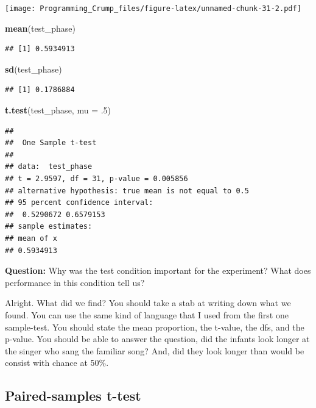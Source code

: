 \documentclass[]{book}
\newenvironment{Shaded}{\begin{snugshade}}{\end{snugshade}}
\newcommand{\KeywordTok}[1]{\textcolor[rgb]{0.13,0.29,0.53}{\textbf{{#1}}}}
\newcommand{\DataTypeTok}[1]{\textcolor[rgb]{0.13,0.29,0.53}{{#1}}}
\newcommand{\DecValTok}[1]{\textcolor[rgb]{0.00,0.00,0.81}{{#1}}}
\newcommand{\NormalTok}[1]{{#1}}
\theoremstyle{definition}
\theoremstyle{definition}
\theoremstyle{definition}
\theoremstyle{remark}
\begin{document}
\texttt{[image: Programming\_Crump\_files/figure-latex/unnamed-chunk-31-2.pdf]}

\begin{Shaded}
\begin{Highlighting}[]
\KeywordTok{mean}\NormalTok{(test_phase)}
\end{Highlighting}
\end{Shaded}

\begin{verbatim}
## [1] 0.5934913
\end{verbatim}

\begin{Shaded}
\begin{Highlighting}[]
\KeywordTok{sd}\NormalTok{(test_phase)}
\end{Highlighting}
\end{Shaded}

\begin{verbatim}
## [1] 0.1786884
\end{verbatim}

\begin{Shaded}
\begin{Highlighting}[]
\KeywordTok{t.test}\NormalTok{(test_phase, }\DataTypeTok{mu =} \NormalTok{.}\DecValTok{5}\NormalTok{)}
\end{Highlighting}
\end{Shaded}

\begin{verbatim}
## 
##  One Sample t-test
## 
## data:  test_phase
## t = 2.9597, df = 31, p-value = 0.005856
## alternative hypothesis: true mean is not equal to 0.5
## 95 percent confidence interval:
##  0.5290672 0.6579153
## sample estimates:
## mean of x 
## 0.5934913
\end{verbatim}

\textbf{Question:} Why was the test condition important for the
experiment? What does performance in this condition tell us?

Alright. What did we find? You should take a stab at writing down what
we found. You can use the same kind of language that I used from the
first one sample-test. You should state the mean proportion, the
t-value, the dfs, and the p-value. You should be able to answer the
question, did the infants look longer at the singer who sang the
familiar song? And, did they look longer than would be consist with
chance at 50\%.

\subsection{Paired-samples t-test}\label{paired-samples-t-test}
\end{document}
